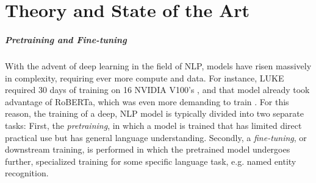 \documentclass[main.tex]{subfiles}
\begin{document}
\chapter{Theory and State of the Art}
\label{chap:theory}
\paragraph{Pretraining and Fine-tuning}
With the advent of deep learning in the field of NLP, models have risen massively in complexity, requiring ever more compute and data.
For instance, LUKE required 30 days of training on 16 NVIDIA V100's \cite{yamada2020luke}, and that model already took advantage of RoBERTa, which was even more demanding to train \cite{liu2019roberta}.
For this reason, the training of a deep, NLP model is typically divided into two separate tasks:
First, the \emph{pretraining}, in which a model is trained that has limited direct practical use but has general language understanding.
Secondly, a \emph{fine-tuning}, or downstream training, is performed in which the pretrained model undergoes further, specialized training for some specific language task, e.g. named entity recognition.
\end{document}
